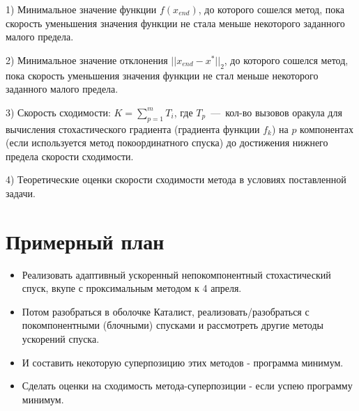 \documentclass[]{scrartcl}
\begin{document}
1) Минимальное значение функции $f(x_{end})$, до которого сошелся метод, пока скорость уменьшения значения функции не стала меньше некоторого заданного малого предела.

2) Минимальное значение отклонения $||x_{end}-x^*||_2$, до которого сошелся метод, пока скорость уменьшения значения функции не стал меньше некоторого заданного малого предела.

3) Скорость сходимости: $K=\sum\limits_{p=1}^{m} T_i$, где $T_p$~---~кол-во вызовов оракула для вычисления стохастического градиента (градиента функции $f_k$) на $p$ компонентах (если используется метод покоординатного спуска) до достижения нижнего предела скорости сходимости.
 
4) Теоретические оценки скорости сходимости метода в условиях поставленной задачи.


\section{Примерный план}
\begin{itemize}
	\item Реализовать адаптивный ускоренный непокомпонентный стохастический спуск, вкупе с проксимальным методом к 4 апреля.
	\item Потом разобраться в оболочке Каталист, реализовать/разобраться с покомпонентными (блочными) спусками и рассмотреть другие методы ускорений спуска.
	\item И составить некоторую суперпозицию этих методов - программа минимум.
	\item Сделать оценки на сходимость метода-суперпозиции  - если успею программу минимум.
	
\end{itemize}



\end{document}
